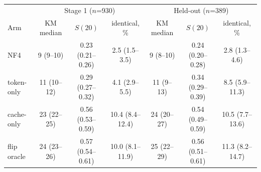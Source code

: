 \begin{tabular}{lcccccc}
\toprule
 & \multicolumn{3}{c}{Stage 1 ($n$=930)} & \multicolumn{3}{c}{Held-out ($n$=389)} \\
Arm & KM median & $S(20)$ & identical, \% & KM median & $S(20)$ & identical, \% \\
\midrule
NF4 & 9 (9--10) & 0.23 (0.21--0.26) & 2.5 (1.5--3.5) & 9 (8--10) & 0.24 (0.20--0.28) & 2.8 (1.3--4.6) \\
token-only & 11 (10--12) & 0.29 (0.27--0.32) & 4.1 (2.9--5.5) & 11 (9--13) & 0.34 (0.29--0.39) & 8.5 (5.9--11.3) \\
cache-only & 23 (22--25) & 0.56 (0.53--0.59) & 10.4 (8.4--12.4) & 24 (20--27) & 0.54 (0.49--0.59) & 10.5 (7.7--13.6) \\
flip oracle & 24 (23--26) & 0.57 (0.54--0.61) & 10.0 (8.1--11.9) & 25 (22--29) & 0.56 (0.51--0.61) & 11.3 (8.2--14.7) \\
\bottomrule
\end{tabular}

